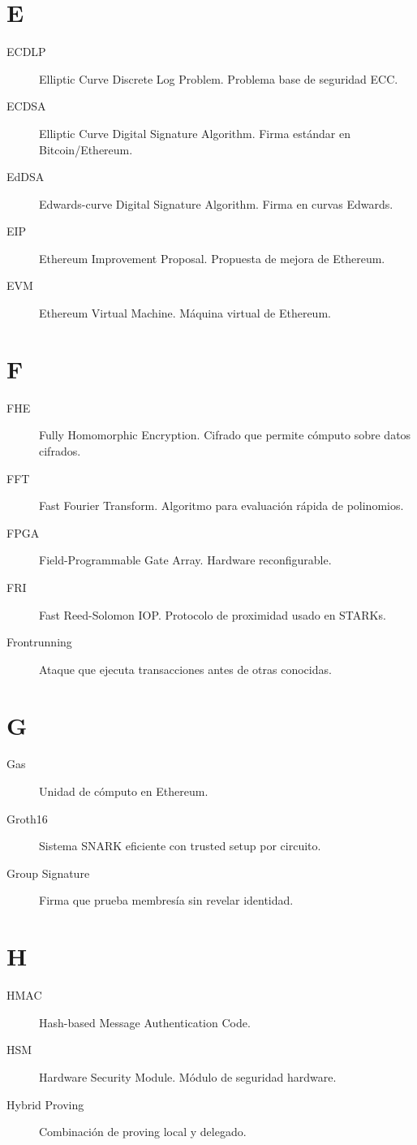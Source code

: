 \documentclass[11pt,a4paper,twoside]{book}
\theoremstyle{definition}
\theoremstyle{remark}
\begin{document}
\section*{E}
\begin{description}
\item[ECDLP] Elliptic Curve Discrete Log Problem. Problema base de seguridad ECC.
\item[ECDSA] Elliptic Curve Digital Signature Algorithm. Firma estándar en Bitcoin/Ethereum.
\item[EdDSA] Edwards-curve Digital Signature Algorithm. Firma en curvas Edwards.
\item[EIP] Ethereum Improvement Proposal. Propuesta de mejora de Ethereum.
\item[EVM] Ethereum Virtual Machine. Máquina virtual de Ethereum.
\end{description}

\section*{F}
\begin{description}
\item[FHE] Fully Homomorphic Encryption. Cifrado que permite cómputo sobre datos cifrados.
\item[FFT] Fast Fourier Transform. Algoritmo para evaluación rápida de polinomios.
\item[FPGA] Field-Programmable Gate Array. Hardware reconfigurable.
\item[FRI] Fast Reed-Solomon IOP. Protocolo de proximidad usado en STARKs.
\item[Frontrunning] Ataque que ejecuta transacciones antes de otras conocidas.
\end{description}

\section*{G}
\begin{description}
\item[Gas] Unidad de cómputo en Ethereum.
\item[Groth16] Sistema SNARK eficiente con trusted setup por circuito.
\item[Group Signature] Firma que prueba membresía sin revelar identidad.
\end{description}

\section*{H}
\begin{description}
\item[HMAC] Hash-based Message Authentication Code.
\item[HSM] Hardware Security Module. Módulo de seguridad hardware.
\item[Hybrid Proving] Combinación de proving local y delegado.
\end{description}
\end{document}
